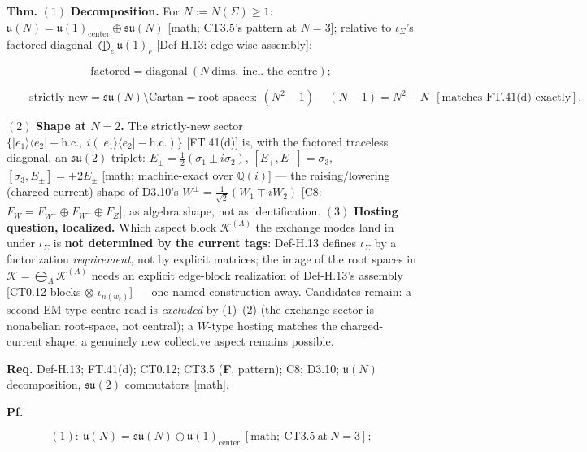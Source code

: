 \begin{theorem}\label{tag:FT-57}
\textbf{Thm.} $(1)$ \textbf{Decomposition.} For $N:=N(\Sigma)\ge1$: $\mathfrak u(N)=\mathfrak u(1)_{\mathrm{center}}\oplus\mathfrak{su}(N)$ [math; CT3.5's pattern at $N{=}3$]; relative to $\iota_\Sigma$'s factored diagonal $\bigoplus_e\mathfrak u(1)_e$ [Def-H.13: edge-wise assembly]:

\[
\text{factored}=\text{diagonal}\ (N\ \text{dims},\ \text{incl. the centre});
\]

\[
\qquad \text{strictly new}=\mathfrak{su}(N)\setminus\text{Cartan}=\text{root spaces}:\ (N^2{-}1)-(N{-}1)=N^2-N\ \ [\text{matches FT.41(d) exactly}].
\]

$(2)$ \textbf{Shape at $N=2$.} The strictly-new sector $\{|e_1\rangle\langle e_2|+\mathrm{h.c.},\ i(|e_1\rangle\langle e_2|-\mathrm{h.c.})\}$ [FT.41(d)] is, with the factored traceless diagonal, an $\mathfrak{su}(2)$ triplet: $E_\pm=\tfrac12(\sigma_1\pm i\sigma_2)$, $[E_+,E_-]=\sigma_3$, $[\sigma_3,E_\pm]=\pm2E_\pm$ [math; machine-exact over $\mathbb Q(i)$] — the raising/lowering (charged-current) shape of D3.10's $W^\pm=\tfrac1{\sqrt2}(W_1\mp iW_2)$ [C8: $F_W=F_{W^+}\oplus F_{W^-}\oplus F_Z$], as algebra shape, not as identification. $(3)$ \textbf{Hosting question, localized.} Which aspect block $\mathcal K^{(A)}$ the exchange modes land in under $\iota_\Sigma$ is \textbf{not determined by the current tags}: Def-H.13 defines $\iota_\Sigma$ by a factorization \textit{requirement}, not by explicit matrices; the image of the root spaces in $\mathcal K=\bigoplus_A\mathcal K^{(A)}$ needs an explicit edge-block realization of Def-H.13's assembly [CT0.12 blocks $\otimes$ $\iota_{n(w_e)}$] — one named construction away. Candidates remain: a second EM-type centre read is \textit{excluded} by (1)–(2) (the exchange sector is nonabelian root-space, not central); a $W$-type hosting matches the charged-current shape; a genuinely new collective aspect remains possible.

\textbf{Req.} Def-H.13; FT.41(d); CT0.12; CT3.5 (\textbf{F}, pattern); C8; D3.10; $\mathfrak u(N)$ decomposition, $\mathfrak{su}(2)$ commutators [math].

\textbf{Pf.}

\[
(1):\ \mathfrak u(N)=\mathfrak{su}(N)\oplus\mathfrak u(1)_{\mathrm{center}}\ [\text{math};\ \mathrm{CT3.5}\ \text{at}\ N{=}3];
\]


\end{theorem}
